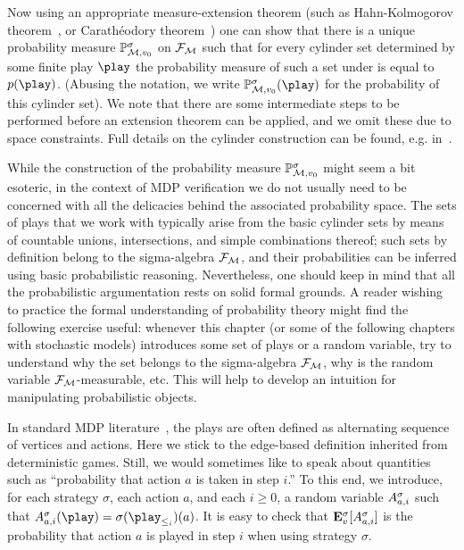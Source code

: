 Now using an appropriate measure-extension theorem
(such as Hahn-Kol\-mo\-go\-rov theorem~\cite[Corollary 2.5.4 and Proposition  2.5.7]{Rosenthal:2006}, or Carath\'eodory theorem~\cite[Theorem 1.3.10]{Ash&Doleans-Dade:2000}) one can show that there is a 
unique probability 
measure $\mathbb{P}^{\sigma}_{\mathcal{M},v_0} $ on $\mathcal{F}_{\mathcal{M}}$ such that for 
every cylinder set determined by some finite play $\play$ the probability 
measure of such a set under is equal to $\cylProb(\play)$. (Abusing the notation, we write $\probm^{\sigma}_{\mdp,\vinit}(\play)$ for the probability of this cylinder set). We note that there 
are some intermediate steps to be performed before an extension theorem 
can be applied, and we omit these due to space constraints. Full details on the 
cylinder construction can be found, e.g. in~\cite{Ash&Doleans-Dade:2000,Novotny:2015}.

While the construction of the probability measure 
$\mathbb{P}^{\sigma}_{\mathcal{M},v_0}$ might seem a bit esoteric, in the context of 
MDP verification we do not usually need to be concerned with all the delicacies 
behind the associated probability space. The sets of plays that we work with 
typically arise from the basic cylinder sets by means of countable unions, 
intersections, and simple combinations thereof; such sets by definition belong 
to the 
sigma-algebra $\mathcal{F}_{\mathcal{M}}$, and their probabilities can be inferred using 
basic probabilistic reasoning. Nevertheless, one should keep in mind that all the 
probabilistic argumentation rests on solid formal grounds. A reader wishing to 
practice the formal understanding of probability theory might find the 
following exercise useful: whenever this chapter (or some of the following 
chapters with stochastic models) introduces some set of plays or a random 
variable, try to understand why the set belongs to the sigma-algebra 
$\mathcal{F}_{\mathcal{M}}$, why is the random variable $\mathcal{F}_{\mathcal{M}}$-measurable, 
etc. This will help to develop an intuition for manipulating probabilistic 
objects.

In standard MDP literature~\cite{xxx}, the plays are often defined as alternating sequence of vertices and actions. Here we stick to the edge-based definition inherited from deterministic games. Still, we would sometimes like to speak about quantities such as ``probability that action $a$ is taken in step $i$.'' To this end, we introduce, for each strategy $\sigma$, each action $a$,  and each $i\geq 0$,  a random variable $A^{\sigma}_{a,i}$ such that $\actevent{\sigma}{a}{i}(\play)=\sigma(\play_{\leq_i})(a)$. It is easy to check that  $\mathbf{E}^\sigma_v[A^{\sigma}_{a,i}]$ is the probability that action $a$ is played in step $i$ when using strategy $\sigma$.

